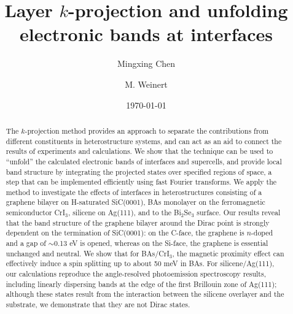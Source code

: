 \documentclass[aps,prb,showpacs,twocolumn,reprint,superscriptaddress]{revtex4-1}
\begin{document}
\title{Layer $k$-projection and unfolding electronic bands at interfaces}
\author {Mingxing Chen}
%
\author {M. Weinert}

\date{\today}

\begin{abstract}
The $k$-projection method provides an approach to separate the contributions from different constituents
in heterostructure systems, and can act as an aid to connect the results of experiments and calculations. 
We show that the technique can be used to ``unfold'' the calculated electronic bands of interfaces and supercells, and
provide local band structure by integrating the projected states over specified regions of space, a step that
can be implemented efficiently using fast Fourier transforms.  
We apply the
method to investigate the effects of interfaces in heterostructures consisting of a graphene bilayer on H-saturated
SiC(0001), BAs monolayer on the ferromagnetic semiconductor CrI$_3$, silicene on Ag(111), and to the
Bi$_2$Se$_3$ surface.  Our results
reveal that the band structure of the graphene bilayer around the Dirac point is strongly dependent on the
termination of SiC(0001): on the C-face, the graphene is $n$-doped and a gap of $\sim$0.13 eV is opened, whereas
on the Si-face, the graphene is essential unchanged and neutral. We show that for BAs/CrI$_3$, the magnetic proximity effect can effectively induce a spin splitting up to about
50 meV in BAs.  For silicene/Ag(111), our calculations reproduce the angle-resolved photoemission
spectroscopy results, including linearly dispersing bands at the edge of the
first Brillouin zone of Ag(111); although these states result from the interaction between the silicene
overlayer and the substrate, we demonstrate that they are not Dirac states.
%
\end{abstract}



\maketitle
\end{document}
